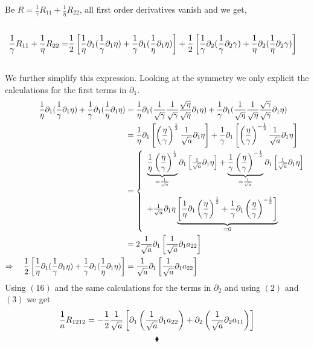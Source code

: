   Be $R = \frac{1}{\gamma}R_{11}+ \frac{1}{\eta}R_{22}$, all first order derivatives vanish and we get,\\\\
  \begin{align}
  \frac{1}{\gamma}R_{11}+ \frac{1}{\eta}R_{22} = & 
 \frac{1}{2} \left[ \frac{1}{\eta}\partial_1(\frac{1}{\gamma}\partial_1 \eta)+ \frac{1}{\gamma} \partial_{1}(\frac{1}{\eta}\partial_{1} \eta)\right]
    + \frac{1}{2}  \left[\frac{1}{\gamma}\partial_{2}(\frac{1}{\gamma}\partial_{2} \gamma)+ \frac{1}{\eta}\partial_2( \frac{1}{\eta}\partial_2 \gamma) \right] 
\end{align}\\
We further simplify this expression. Looking at the symmetry we only explicit the calculations for the first terms in $\partial_1$.
\begin{align}
 \frac{1}{\eta}\partial_1(\frac{1}{\gamma}\partial_1 \eta)+ \frac{1}{\gamma} \partial_{1}(\frac{1}{\eta}\partial_{1} \eta)&=\frac{1}{\eta}\partial_1(\frac{1}{\sqrt{\gamma}}\frac{1}{\sqrt{\gamma}}\frac{\sqrt{\eta}}{\sqrt{\eta}}\partial_1 \eta)+ \frac{1}{\gamma} \partial_{1}(\frac{1}{\sqrt{\eta}}\frac{1}{\sqrt{\eta}}\frac{\sqrt{\gamma}}{\sqrt{\gamma}}\partial_{1} \eta)\\
 &=\frac{1}{\eta}\partial_1\left[\left(\frac{\eta}{\gamma}\right)^{\frac{1}{2}}\frac{1}{\sqrt{a}}\partial_1 \eta\right]+ \frac{1}{\gamma} \partial_{1}\left[\left(\frac{\eta}{\gamma}\right)^{-\frac{1}{2}}\frac{1}{\sqrt{a}}\partial_{1} \eta\right]\\
 &=\left \{ \begin{array}{l}
\underbrace{\frac{1}{\eta}\left(\frac{\eta}{\gamma}\right)^{\frac{1}{2}}}_{= \frac{1}{\sqrt{a}}}\partial_1\left[\frac{1}{\sqrt{a}}\partial_1 \eta\right]+ \underbrace{\frac{1}{\gamma} \left(\frac{\eta}{\gamma}\right)^{-\frac{1}{2}}}_{= \frac{1}{\sqrt{a}}}\partial_{1}\left[\frac{1}{\sqrt{a}}\partial_{1} \eta\right]\\\\
+\frac{1}{\sqrt{a}}\partial_1 \eta\underbrace{\left[\frac{1}{\eta}\partial_1\left(\frac{\eta}{\gamma}\right)^{\frac{1}{2}}+ \frac{1}{\gamma} \partial_{1}\left(\frac{\eta}{\gamma}\right)^{-\frac{1}{2}}\right]}_{=0}
 \end {array}\right.\\
  &= 2\frac{1}{\sqrt{a}}\partial_1\left[\frac{1}{\sqrt{a}}\partial_1 a_{22}\right]\\
  \Rightarrow \quad  \frac{1}{2} \left[ \frac{1}{\eta}\partial_1(\frac{1}{\gamma}\partial_1 \eta) + \frac{1}{\gamma} \partial_{1}(\frac{1}{\eta}\partial_{1} \eta)\right] &=  \frac{1}{\sqrt{a}}\partial_1\left[\frac{1}{\sqrt{a}}\partial_1 a_{22}\right]  
\end{align}
Using $(16)$ and the same calculations for the terms in $\partial_2$ and using $(2)$ and $(3)$ we  get $$\frac{1}{a}R_{1212}= -\frac{1}{2}\frac{1}{\sqrt{a}}\left[\partial_1\left(\frac{1}{\sqrt{a}}\partial_1 a_{22}\right)+\partial_2\left(\frac{1}{\sqrt{a}}\partial_2 a_{11}\right)\right]$$
$$\blacklozenge$$
\newpage